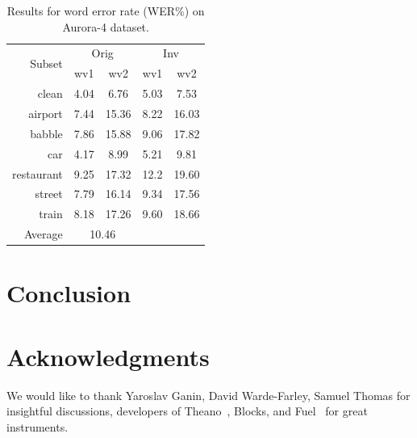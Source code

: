 \documentclass{article}
\begin{document}
\begin{table}
    \centering
    \caption{Results for word error rate (WER\%) on Aurora-4 dataset.}
    \label{tab:results}
    \begin{tabular}{r|cc|cc}
    \multirow{2}{*}{Subset} & \multicolumn{2}{c}{Orig}  & \multicolumn{2}{|c}{Inv}\\ 
               & wv1  & wv2  & wv1  & wv2 \\
    \hline 
    clean      & 4.04 & 6.76 & 5.03& 7.53 \\
    airport    & 7.44 & 15.36& 8.22& 16.03\\
    babble     & 7.86 & 15.88& 9.06& 17.82\\
    car        & 4.17 & 8.99 & 5.21& 9.81 \\
    restaurant & 9.25 & 17.32& 12.2& 19.60\\
    street     & 7.79 & 16.14& 9.34& 17.56\\
    train      & 8.18 & 17.26& 9.60& 18.66\\
    \hline
    Average    & \multicolumn{2}{c}{10.46}& & 
    \end{tabular}
\end{table}

\section{Conclusion}


\section*{Acknowledgments}

We would like to thank Yaroslav Ganin, David Warde-Farley, Samuel Thomas for insightful discussions,
developers of Theano~\cite{2016arXiv160502688short}, Blocks, and Fuel~\cite{MerrienboerBDSW15} 
for great instruments.

%


\end{document}
